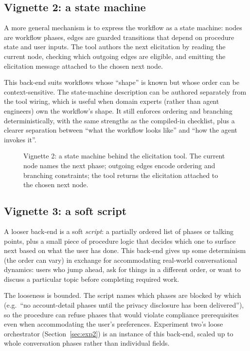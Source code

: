 \documentclass[11pt,a4paper]{article}
\begin{document}
\subsection{Vignette 2: a state machine}

A more general mechanism is to express the workflow as a state machine: nodes are workflow phases, edges are guarded transitions that depend on procedure state and user inputs. The tool authors the next elicitation by reading the current node, checking which outgoing edges are eligible, and emitting the elicitation message attached to the chosen next node.

This back-end suits workflows whose ``shape'' is known but whose order can be context-sensitive. The state-machine description can be authored separately from the tool wiring, which is useful when domain experts (rather than agent engineers) own the workflow's shape. It still enforces ordering and branching deterministically, with the same strengths as the compiled-in checklist, plus a clearer separation between ``what the workflow looks like'' and ``how the agent invokes it''.

\begin{figure}[htbp]
  \centering
  
  \caption{Vignette 2: a state machine behind the elicitation tool. The
  current node names the next phase; outgoing edges encode ordering and
  branching constraints; the tool returns the elicitation attached to the
  chosen next node.}
  \label{fig:tool-internals-state-machine}
\end{figure}

\subsection{Vignette 3: a soft script}

A looser back-end is a soft \emph{script}: a partially ordered list of phases or talking points, plus a small piece of procedure logic that decides which one to surface next based on what the user has done. This back-end gives up some determinism (the order can vary) in exchange for accommodating real-world conversational dynamics: users who jump ahead, ask for things in a different order, or want to discuss a particular topic before completing required work.

The looseness is bounded. The script names which phases are blocked by which (e.g.\ ``no account-detail phases until the privacy disclosure has been delivered''), so the procedure can refuse phases that would violate compliance prerequisites even when accommodating the user's preferences. Experiment two's loose orchestrator (Section~\ref{sec:exp2}) is an instance of this back-end, scaled up to whole conversation phases rather than individual fields.
\end{document}
